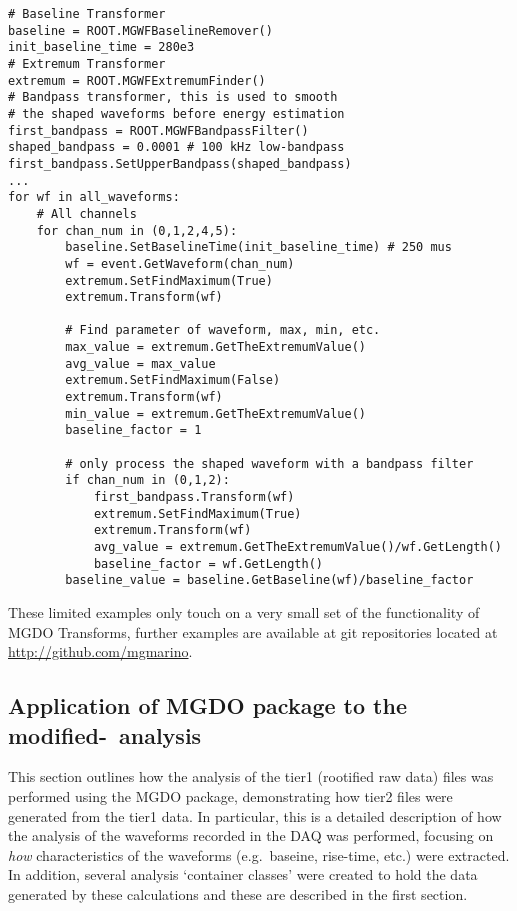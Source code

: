 	\lstset{
	   language=Python}			
			\begin{lstlisting}[caption=Calculating general waveform characteristics in Python]			
# Baseline Transformer
baseline = ROOT.MGWFBaselineRemover()
init_baseline_time = 280e3
# Extremum Transformer
extremum = ROOT.MGWFExtremumFinder()
# Bandpass transformer, this is used to smooth
# the shaped waveforms before energy estimation 
first_bandpass = ROOT.MGWFBandpassFilter()
shaped_bandpass = 0.0001 # 100 kHz low-bandpass
first_bandpass.SetUpperBandpass(shaped_bandpass)
...
for wf in all_waveforms:
    # All channels
    for chan_num in (0,1,2,4,5):
        baseline.SetBaselineTime(init_baseline_time) # 250 mus
        wf = event.GetWaveform(chan_num)
        extremum.SetFindMaximum(True)
        extremum.Transform(wf)

        # Find parameter of waveform, max, min, etc.
        max_value = extremum.GetTheExtremumValue()
        avg_value = max_value
        extremum.SetFindMaximum(False)
        extremum.Transform(wf)
        min_value = extremum.GetTheExtremumValue()
        baseline_factor = 1

        # only process the shaped waveform with a bandpass filter
        if chan_num in (0,1,2):
            first_bandpass.Transform(wf)
            extremum.SetFindMaximum(True)
            extremum.Transform(wf)
            avg_value = extremum.GetTheExtremumValue()/wf.GetLength()
            baseline_factor = wf.GetLength()
        baseline_value = baseline.GetBaseline(wf)/baseline_factor
			\end{lstlisting}	

These limited examples only touch on a very small set of the functionality of MGDO Transforms, further examples are available at git repositories located at \url{http://github.com/mgmarino}.
	
		\subsection{Application of MGDO package to the modified-\bege~analysis}
		
This section outlines how the analysis of the tier1 (rootified raw data) files was performed using the MGDO package, demonstrating how tier2 files were generated from the tier1 data.  In particular, this is a detailed description of how the analysis of the waveforms recorded in the DAQ was performed, focusing on \emph{how} characteristics of the waveforms (e.g.~baseine, rise-time, etc.) were extracted.  In addition, several analysis `container classes' were created to hold the data generated by these calculations and these are described in the first section.  

